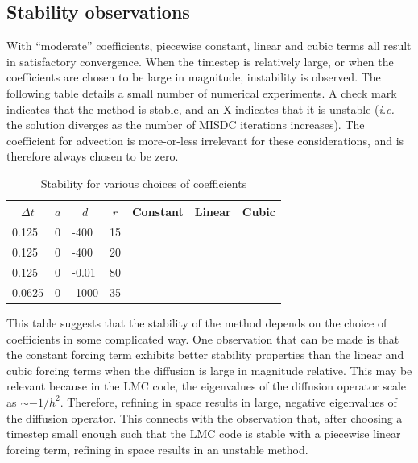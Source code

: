 \documentclass[12pt]{article}
\newcommand{\cmark}{\ding{51}}%
\newcommand{\xmark}{\ding{55}}%
\begin{document}
\subsection{Stability observations}
With ``moderate'' coefficients, piecewise constant, linear and cubic terms all 
result in satisfactory convergence. When the timestep is relatively large, or 
when the coefficients are chosen to be large in magnitude, instability is 
observed. The following table details a small number of numerical experiments. 
A check mark indicates that the method is stable, and an X indicates that 
it is unstable (\textit{i.e.} the solution diverges as the number of MISDC 
iterations increases). The coefficient for advection is more-or-less irrelevant 
for these considerations, and is therefore always chosen to be zero.
\begin{table}[H]
\centering
\caption{Stability for various choices of coefficients}
\label{my-label}
\begin{tabular}{llll|ccc}
\multicolumn{1}{c}{$\Delta t$} & \multicolumn{1}{c}{$a$} & \multicolumn{1}{c}{$d$} & \multicolumn{1}{c|}{$r$} & Constant & Linear & Cubic  \\ \hline
0.125                          & 0                       & -400                    & 15                       & \cmark   & \xmark & \xmark \\
0.125                          & 0                       & -400                    & 20                       & \xmark   & \xmark & \xmark \\
0.125                          & 0                       & -0.01                   & 80                       & \xmark   & \cmark & \cmark \\
0.0625                         & 0                       & -1000                   & 35                       & \cmark   & \xmark & \xmark
\end{tabular}
\end{table}

This table suggests that the stability of the method depends on the choice of 
coefficients in some complicated way. One observation that can be made is that 
the constant forcing term exhibits better stability properties than the linear 
and cubic forcing terms when the diffusion is large in magnitude relative. This 
may be relevant because in the LMC code, the eigenvalues 
of the diffusion operator scale as $\sim -1/h^2$. Therefore, refining in space 
results in large, negative eigenvalues of the diffusion operator. This connects 
with the observation that, after choosing a timestep small enough such that the 
LMC code is stable with a piecewise linear forcing term, refining in space 
results in an unstable method. 
\end{document}
